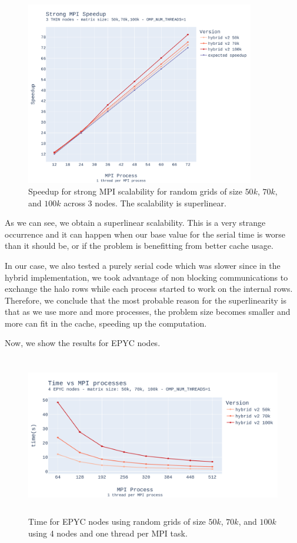 \documentclass{report}
\begin{document}
\begin{figure}[H]
\centering
\includegraphics[width=10cm, height=8cm]{./images/strong_MPI_thin_hybrid_speedup.pdf}
\caption{\label{fig:strongmpithinhybridspeedup} Speedup for strong MPI scalability 
for random grids of size $50k$, $70k$, and $100k$ across 3 nodes. The scalability 
is superlinear.}
\end{figure}

As we can see, we obtain a superlinear scalability. This is a very strange 
occurrence and it can happen when our base value for the serial time is worse 
than it should be, or if the problem is benefitting from better cache usage. 

In our case, we also tested a purely serial code which was slower since in the 
hybrid implementation, we took advantage of non blocking communications to 
exchange the halo rows while each process started to work on the internal rows. 
Therefore, we conclude that the most probable reason for the superlinearity 
is that as we use more and more processes, the problem size becomes smaller and 
more can fit in the cache, speeding up the computation.

Now, we show the results for EPYC nodes.

\begin{figure}[H]
\centering
\includegraphics[width=14cm, height=7cm]{./images/strong_MPI_epyc_hybrid_grid_100k.pdf}
\caption{\label{fig:strongmpiepychybrid} Time for EPYC nodes using random grids 
of size $50k$, $70k$, and $100k$ using 4 nodes and one thread per MPI task. }
\end{figure}
\end{document}
